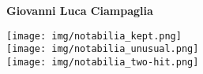 \documentclass[10pt, a5paper]{article}
\begin{document}
%
\reversemarginpar
\thispagestyle{empty}
\raggedleft
\begin{minipage}[t]{.6\linewidth}
\vspace{2cm}
{\huge\bfseries Giovanni Luca Ciampaglia}\\
\end{minipage}

\newpage

\begin{minipage}[t]{.3\linewidth} 
\texttt{[image: img/notabilia\_kept.png]}\\[.4cm]
\texttt{[image: img/notabilia\_unusual.png]}\\[.4cm]
\texttt{[image: img/notabilia\_two-hit.png]}
\end{minipage}\hfill
\end{document}

